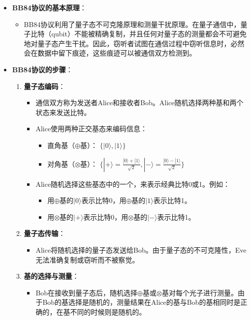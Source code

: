 \documentclass[dvipsnames, svgnames,a4paper,11pt]{article}
\begin{document}
	\begin{itemize}
		\item \textbf{BB84协议的基本原理}：
		\begin{itemize}
			\item BB84协议利用了量子态不可克隆原理和测量干扰原理。在量子通信中，量子比特（qubit）不能被精确复制，并且任何对量子态的测量都会不可避免地对量子态产生干扰。因此，窃听者试图在通信过程中窃听信息时，必然会在数据中留下痕迹，这些痕迹可以被通信双方检测到。
		\end{itemize}
		
		\item \textbf{BB84协议的步骤}：
		\begin{enumerate}
			\item \textbf{量子态编码}：
			\begin{itemize}
				\item 通信双方称为发送者Alice和接收者Bob。Alice随机选择两种基和两个状态来发送比特。
				\item Alice使用两种正交基态来编码信息：
				\begin{itemize}
					\item 直角基（$\oplus$基）： $\{|0\rangle, |1\rangle\}$
					\item 对角基（$\otimes$基）： $\{|+\rangle = \frac{|0\rangle + |1\rangle}{\sqrt{2}}, |-\rangle = \frac{|0\rangle - |1\rangle}{\sqrt{2}}\}$
				\end{itemize}
				\item Alice随机选择这些基态中的一个，来表示经典比特0或1。例如：
				\begin{itemize}
					\item 用$\oplus$基的$|0\rangle$表示比特0，用$\oplus$基的$|1\rangle$表示比特1。
					\item 用$\otimes$基的$|+\rangle$表示比特0，用$\otimes$基的$|-\rangle$表示比特1。
				\end{itemize}
			\end{itemize}

			\item \textbf{量子态传输}：
			\begin{itemize}
				\item Alice将随机选择的量子态发送给Bob。由于量子态的不可克隆性，Eve无法准确复制或窃听而不被察觉。
			\end{itemize}

			\item \textbf{基的选择与测量}：
			\begin{itemize}
				\item Bob在接收到量子态后，随机选择$\oplus$基或$\otimes$基对每个光子进行测量。由于Bob的基选择是随机的，测量结果在Alice的基与Bob的基相同时是正确的，在基不同的时候则是随机的。
			\end{itemize}


\end{enumerate}
\end{itemize}
\end{document}
